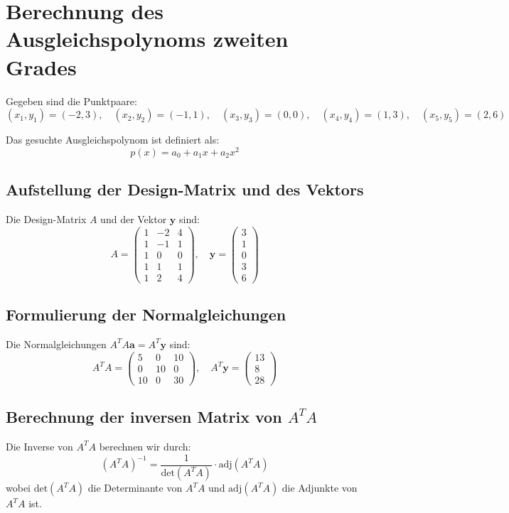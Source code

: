 
\section*{Berechnung des Ausgleichspolynoms zweiten Grades}

Gegeben sind die Punktpaare:
\[
(x_1, y_1) = (-2, 3), \quad (x_2, y_2) = (-1, 1), \quad (x_3, y_3) = (0, 0), \quad (x_4, y_4) = (1, 3), \quad (x_5, y_5) = (2, 6)
\]

Das gesuchte Ausgleichspolynom ist definiert als:
\[
p(x) = a_0 + a_1 x + a_2 x^2
\]

\subsection*{Aufstellung der Design-Matrix und des Vektors}
Die Design-Matrix \( A \) und der Vektor \( \mathbf{y} \) sind:
\[
A = \begin{pmatrix}
1 & -2 & 4 \\
1 & -1 & 1 \\
1 & 0 & 0 \\
1 & 1 & 1 \\
1 & 2 & 4
\end{pmatrix}, \quad \mathbf{y} = \begin{pmatrix}
3 \\
1 \\
0 \\
3 \\
6
\end{pmatrix}
\]

\subsection*{Formulierung der Normalgleichungen}
Die Normalgleichungen \( A^T A \mathbf{a} = A^T \mathbf{y} \) sind:
\[
A^T A = \begin{pmatrix}
5 & 0 & 10 \\
0 & 10 & 0 \\
10 & 0 & 30
\end{pmatrix}, \quad A^T \mathbf{y} = \begin{pmatrix}
13 \\
8 \\
28
\end{pmatrix}
\]

\subsection*{Berechnung der inversen Matrix von \(A^T A\)}
Die Inverse von \(A^T A\) berechnen wir durch:
\[
(A^T A)^{-1} = \frac{1}{\text{det}(A^T A)} \cdot \text{adj}(A^T A)
\]
wobei \(\text{det}(A^T A)\) die Determinante von \(A^T A\) und \(\text{adj}(A^T A)\) die Adjunkte von \(A^T A\) ist.

